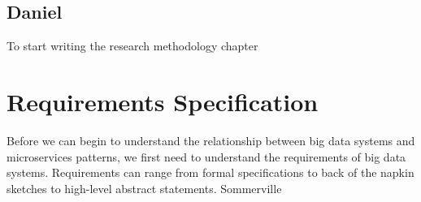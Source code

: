 \documentclass{article}
\theoremstyle{mytheoremstyle}
\theoremstyle{mytheoremstyle}
\theoremstyle{myproblemstyle}
\begin{document}
\subsection{Daniel}
To start writing the research methodology chapter 


\section{Requirements Specification}

Before we can begin to understand the relationship between big data systems and microservices patterns, we first need to understand the requirements of big data systems. Requirements can range from formal specifications to back of the napkin sketches to high-level abstract statements. Sommerville 
\end{document}

